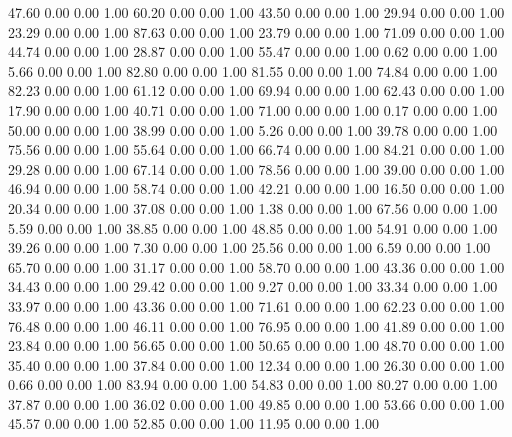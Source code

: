   47.60   0.00   0.00   1.00
   60.20   0.00   0.00   1.00
   43.50   0.00   0.00   1.00
   29.94   0.00   0.00   1.00
   23.29   0.00   0.00   1.00
   87.63   0.00   0.00   1.00
   23.79   0.00   0.00   1.00
   71.09   0.00   0.00   1.00
   44.74   0.00   0.00   1.00
   28.87   0.00   0.00   1.00
   55.47   0.00   0.00   1.00
    0.62   0.00   0.00   1.00
    5.66   0.00   0.00   1.00
   82.80   0.00   0.00   1.00
   81.55   0.00   0.00   1.00
   74.84   0.00   0.00   1.00
   82.23   0.00   0.00   1.00
   61.12   0.00   0.00   1.00
   69.94   0.00   0.00   1.00
   62.43   0.00   0.00   1.00
   17.90   0.00   0.00   1.00
   40.71   0.00   0.00   1.00
   71.00   0.00   0.00   1.00
    0.17   0.00   0.00   1.00
   50.00   0.00   0.00   1.00
   38.99   0.00   0.00   1.00
    5.26   0.00   0.00   1.00
   39.78   0.00   0.00   1.00
   75.56   0.00   0.00   1.00
   55.64   0.00   0.00   1.00
   66.74   0.00   0.00   1.00
   84.21   0.00   0.00   1.00
   29.28   0.00   0.00   1.00
   67.14   0.00   0.00   1.00
   78.56   0.00   0.00   1.00
   39.00   0.00   0.00   1.00
   46.94   0.00   0.00   1.00
   58.74   0.00   0.00   1.00
   42.21   0.00   0.00   1.00
   16.50   0.00   0.00   1.00
   20.34   0.00   0.00   1.00
   37.08   0.00   0.00   1.00
    1.38   0.00   0.00   1.00
   67.56   0.00   0.00   1.00
    5.59   0.00   0.00   1.00
   38.85   0.00   0.00   1.00
   48.85   0.00   0.00   1.00
   54.91   0.00   0.00   1.00
   39.26   0.00   0.00   1.00
    7.30   0.00   0.00   1.00
   25.56   0.00   0.00   1.00
    6.59   0.00   0.00   1.00
   65.70   0.00   0.00   1.00
   31.17   0.00   0.00   1.00
   58.70   0.00   0.00   1.00
   43.36   0.00   0.00   1.00
   34.43   0.00   0.00   1.00
   29.42   0.00   0.00   1.00
    9.27   0.00   0.00   1.00
   33.34   0.00   0.00   1.00
   33.97   0.00   0.00   1.00
   43.36   0.00   0.00   1.00
   71.61   0.00   0.00   1.00
   62.23   0.00   0.00   1.00
   76.48   0.00   0.00   1.00
   46.11   0.00   0.00   1.00
   76.95   0.00   0.00   1.00
   41.89   0.00   0.00   1.00
   23.84   0.00   0.00   1.00
   56.65   0.00   0.00   1.00
   50.65   0.00   0.00   1.00
   48.70   0.00   0.00   1.00
   35.40   0.00   0.00   1.00
   37.84   0.00   0.00   1.00
   12.34   0.00   0.00   1.00
   26.30   0.00   0.00   1.00
    0.66   0.00   0.00   1.00
   83.94   0.00   0.00   1.00
   54.83   0.00   0.00   1.00
   80.27   0.00   0.00   1.00
   37.87   0.00   0.00   1.00
   36.02   0.00   0.00   1.00
   49.85   0.00   0.00   1.00
   53.66   0.00   0.00   1.00
   45.57   0.00   0.00   1.00
   52.85   0.00   0.00   1.00
   11.95   0.00   0.00   1.00
